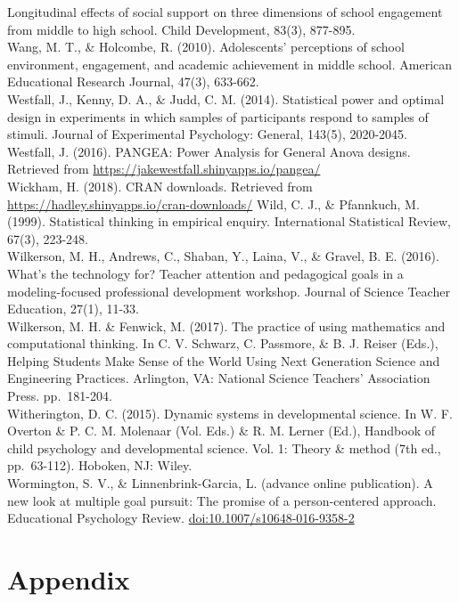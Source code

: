\documentclass[]{book}
\theoremstyle{definition}
\theoremstyle{definition}
\theoremstyle{definition}
\theoremstyle{remark}
\begin{document}
Longitudinal effects of social support on three dimensions of school
engagement from middle to high school. Child Development, 83(3),
877-895.\\
Wang, M. T., \& Holcombe, R. (2010). Adolescents' perceptions of school
environment, engagement, and academic achievement in middle school.
American Educational Research Journal, 47(3), 633-662.\\
Westfall, J., Kenny, D. A., \& Judd, C. M. (2014). Statistical power and
optimal design in experiments in which samples of participants respond
to samples of stimuli. Journal of Experimental Psychology: General,
143(5), 2020-2045.\\
Westfall, J. (2016). PANGEA: Power Analysis for General Anova designs.
Retrieved from \url{https://jakewestfall.shinyapps.io/pangea/}\\
Wickham, H. (2018). CRAN downloads. Retrieved from
\url{https://hadley.shinyapps.io/cran-downloads/} Wild, C. J., \&
Pfannkuch, M. (1999). Statistical thinking in empirical enquiry.
International Statistical Review, 67(3), 223-248.\\
Wilkerson, M. H., Andrews, C., Shaban, Y., Laina, V., \& Gravel, B. E.
(2016). What's the technology for? Teacher attention and pedagogical
goals in a modeling-focused professional development workshop. Journal
of Science Teacher Education, 27(1), 11-33.\\
Wilkerson, M. H. \& Fenwick, M. (2017). The practice of using
mathematics and computational thinking. In C. V. Schwarz, C. Passmore,
\& B. J. Reiser (Eds.), Helping Students Make Sense of the World Using
Next Generation Science and Engineering Practices. Arlington, VA:
National Science Teachers' Association Press. pp.~181-204.\\
Witherington, D. C. (2015). Dynamic systems in developmental science. In
W. F. Overton \& P. C. M. Molenaar (Vol. Eds.) \& R. M. Lerner (Ed.),
Handbook of child psychology and developmental science. Vol. 1: Theory
\& method (7th ed., pp.~63-112). Hoboken, NJ: Wiley.\\
Wormington, S. V., \& Linnenbrink-Garcia, L. (advance online
publication). A new look at multiple goal pursuit: The promise of a
person-centered approach. Educational Psychology Review.
\url{doi:10.1007/s10648-016-9358-2}

\section{Appendix}\label{appendix}
\end{document}
